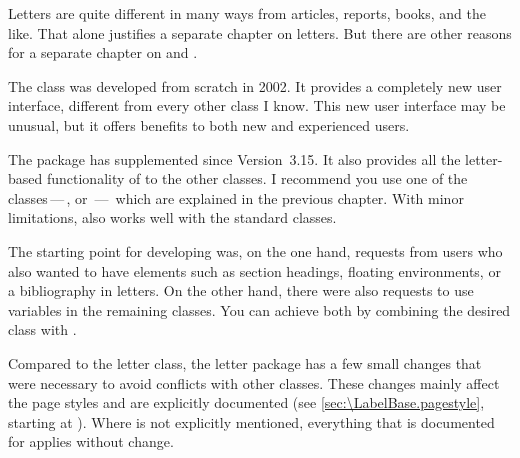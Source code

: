 \BeginIndexGroup
{}%
%
Letters are quite different in many ways from articles, reports, books, and
the like. That alone justifies a separate chapter on letters. But there are
other reasons for a separate chapter on  and
.

The  class was developed from
scratch in 2002. It provides a completely new user interface, different from
every other class I know. This new user interface may be unusual, but it
offers benefits to both new and experienced {\KOMAScript} users.

The %
 package has supplemented \KOMAScript{}
since Version~3.15. It also provides all the letter-based functionality of
 to the other classes. I recommend you use one of the
\KOMAScript{} classes\,---\,,  or
\,---\, which are explained in the previous chapter. With
minor limitations,  also works well with the standard
classes.

The starting point for developing  was, on the one hand,
requests from users who also wanted to have elements such as
section headings, floating
environments, or a bibliography in letters. On the other hand, there were also
requests to use  variables in the remaining \KOMAScript{}
classes. You can achieve both by combining the desired \KOMAScript{} class
with .

Compared to the letter class, the letter package has a few small changes that
were necessary to avoid conflicts with other classes. These changes mainly
affect the page styles and are explicitly documented (see
\autoref{sec:\LabelBase.pagestyle}, starting at
). Where  is not
explicitly mentioned, everything that is documented for 
applies without change.



